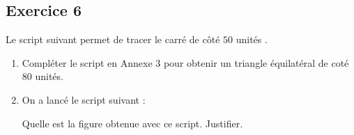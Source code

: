 \documentclass[10pt]{article}
\begin{document}
\newpage

\subsection*{Exercice 6 \hfill }

Le script suivant permet de tracer le carré de côté $50$ unités .
\begin{center}
    \begin{scratch}
        {
        }
    \end{scratch}
\end{center}


\begin{enumerate}
\item Compléter le script en Annexe 3 pour obtenir un triangle équilatéral de coté $80$ unités.
    
\item On a lancé le script suivant :

\begin{center}
    \begin{scratch}
        {
        }
    \end{scratch}
\end{center}

Quelle est la figure obtenue avec ce script. Justifier.

\end{enumerate}
\end{document}
